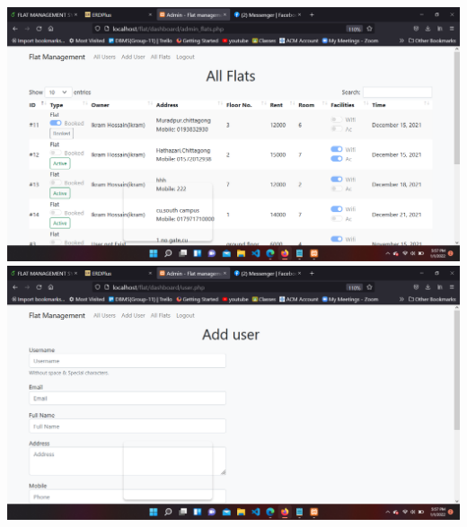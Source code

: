 \includegraphics[width=1\textwidth, inner]{images/flat8.png}\\
\includegraphics[width=1\textwidth, inner]{images/flat9.png}\\
 
\clearpage